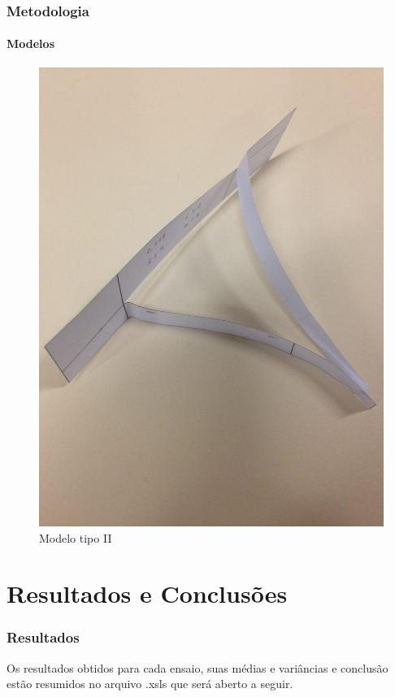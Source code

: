 \documentclass{beamer}
\begin{document}
    \begin{frame}
        \frametitle{Metodologia}
            \framesubtitle{Modelos}
        \begin{figure}
            \label{fig:modelo tipo 2}
            \includegraphics[scale=0.1]{foto02}
            \caption{Modelo tipo II}
        \end{figure}
    \end{frame}

    \section{Resultados e Conclusões}
       \begin{frame}
         \frametitle{Resultados}
            Os resultados obtidos para cada ensaio, suas médias e variâncias e conclusão estão resumidos no arquivo .xsls que será aberto a seguir.
       \end{frame}





\end{document}
